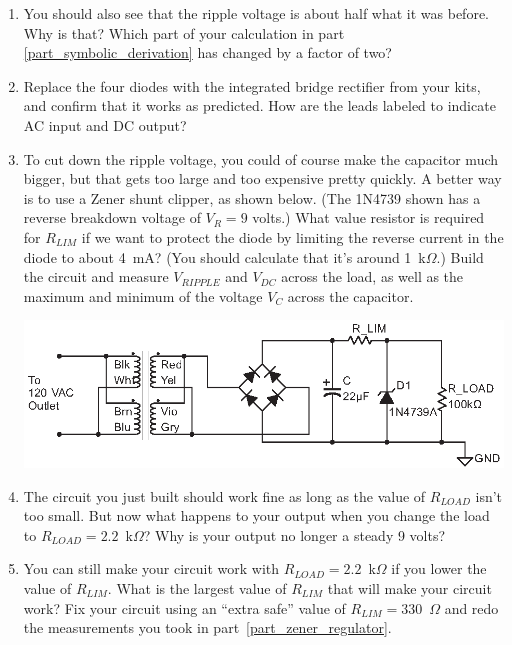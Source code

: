 \begin{enumerate}[wide]
\item You should also see that the ripple voltage is about half what it was before.  Why is that?  Which part of your calculation in part \ref{part_symbolic_derivation} has changed by a factor of two?  

\item Replace the four diodes with the integrated bridge rectifier from your kits, and confirm that it works as predicted.  How are the leads labeled to indicate AC input and DC output?

\item To cut down the ripple voltage, you could of course make the capacitor much bigger, but that gets too large and too expensive pretty quickly.  A better way is to use a Zener shunt clipper, as shown below.  (The 1N4739 shown has a reverse breakdown voltage of $V_R=9$ volts.)  What value resistor is required for $R_{LIM}$ if we want to protect the diode by limiting the reverse current in the diode to about 4~mA?  (You should calculate that it's around 1~k$\Omega$.) Build the circuit and measure $V_{RIPPLE}$ and $V_{DC}$ across the load, as well as the maximum and minimum of the voltage $V_C$ across the capacitor.  \label{part_zener_regulator}
\begin{center}
\includegraphics{power_supply/zener_regulator.eps}
\end{center}

\item The circuit you just built should work fine as long as the value of $R_{LOAD}$ isn't too small.  But now what happens to your output when you change the load to $R_{LOAD} = 2.2$~k$\Omega$?  Why is your output no longer a steady 9 volts?

\item You can still make your circuit work with $R_{LOAD} = 2.2$~k$\Omega$ if you lower the value of $R_{LIM}$.  What is the largest value of $R_{LIM}$ that will make your circuit work?  Fix your circuit using an ``extra safe'' value of $R_{LIM}=330$~$\Omega$ and redo the measurements you took in part~\ref{part_zener_regulator}.  \label{part_small_rlim}


\end{enumerate}

